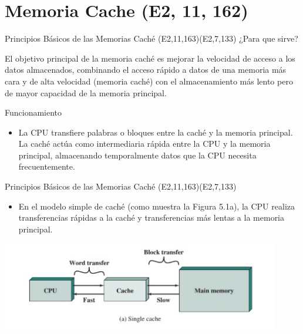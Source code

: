\documentclass[presentation]{beamer}
\begin{document}
\section{Memoria Cache (E2, 11, 162)}
\label{sec:org1aeb46c}
\begin{frame}[label={sec:org4824df3}]{Principios Básicos de las Memorias Caché (E2,11,163)(E2,7,133)}
\alert{\alert{\alert{¿Para que sirve?}}} 


El objetivo principal de la memoria caché es mejorar la velocidad de acceso a los datos almacenados, combinando el acceso rápido a datos de una memoria más cara y de alta velocidad (memoria caché) con el almacenamiento más lento pero de mayor capacidad de la memoria principal.


\alert{\alert{\alert{Funcionamiento}}}


\begin{itemize}
\item La CPU transfiere palabras o bloques entre la caché y la memoria principal. La caché actúa como intermediaria rápida entre la CPU y la memoria principal, almacenando temporalmente datos que la CPU necesita frecuentemente.
\end{itemize}
\end{frame}


\begin{frame}[label={sec:org374099d}]{Principios Básicos de las Memorias Caché (E2,11,163)(E2,7,133)}
\begin{itemize}
\item En el modelo simple de caché (como muestra la Figura 5.1a), la CPU realiza transferencias rápidas a la caché y transferencias más lentas a la memoria principal.
\end{itemize}

\begin{center}
\includegraphics[width=.9\linewidth]{./Imagenes/captura1.png}
\end{center}
\end{frame}
\end{document}
